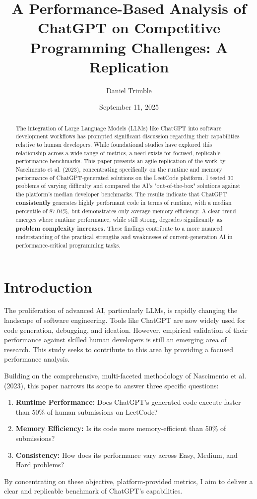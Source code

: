 \documentclass[12pt, a4paper]{article}
\title{A Performance-Based Analysis of ChatGPT on Competitive Programming Challenges: A Replication}
\author{Daniel Trimble}
\date{September 11, 2025}
\begin{document}
\maketitle

\begin{abstract}
The integration of Large Language Models (LLMs) like ChatGPT into software development workflows has prompted significant discussion regarding their capabilities relative to human developers. While foundational studies have explored this relationship across a wide range of metrics, a need exists for focused, replicable performance benchmarks. This paper presents an agile replication of the work by Nascimento et al. (2023), concentrating specifically on the runtime and memory performance of ChatGPT-generated solutions on the LeetCode platform. I tested 30 problems of varying difficulty and compared the AI's "out-of-the-box" solutions against the platform's median developer benchmarks. The results indicate that ChatGPT \textbf{consistently} generates highly performant code in terms of runtime, with a median percentile of 87.04\%, but demonstrates only average memory efficiency. A clear trend emerges where runtime performance, while still strong, degrades significantly \textbf{as problem complexity increases.} These findings contribute to a more nuanced understanding of the practical strengths and weaknesses of current-generation AI in performance-critical programming tasks.
\end{abstract}

\section{Introduction}

The proliferation of advanced AI, particularly LLMs, is rapidly changing the landscape of software engineering. Tools like ChatGPT are now widely used for code generation, debugging, and ideation. However, empirical validation of their performance against skilled human developers is still an emerging area of research. This study seeks to contribute to this area by providing a focused performance analysis.

Building on the comprehensive, multi-faceted methodology of Nascimento et al. (2023), this paper narrows its scope to answer three specific questions:
\begin{enumerate}
    \item \textbf{Runtime Performance:} Does ChatGPT's generated code execute faster than 50\% of human submissions on LeetCode?
    \item \textbf{Memory Efficiency:} Is its code more memory-efficient than 50\% of submissions?
    \item \textbf{Consistency:} How does its performance vary across Easy, Medium, and Hard problems?
\end{enumerate}
By concentrating on these objective, platform-provided metrics, I aim to deliver a clear and replicable benchmark of ChatGPT's capabilities.
\end{document}
